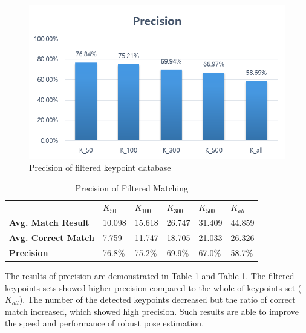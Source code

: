 \begin{figure}[t!]
\centering
\includegraphics[width=1.0\columnwidth]{4_experiments/precision}
\caption{Precision of filtered keypoint database}
\label{fig:markerless_precision}
\end{figure}

\begin{table}[b!]
\centering
\begin{tabular}{llllll}
\hline
\textbf{}                   & \textbf{$K_{50}$} & \textbf{$K_{100}$} & \textbf{$K_{300}$} & \textbf{$K_{500}$} & \textbf{$K_{all}$} \\
\textbf{Avg. Match Result}  & 10.098            & 15.618             & 26.747             & 31.409             & 44.859             \\
\textbf{Avg. Correct Match} & 7.759             & 11.747             & 18.705             & 21.033             & 26.326             \\
\textbf{Precision}          & 76.8\%            & 75.2\%             & 69.9\%             & 67.0\%             & 58.7\%             \\ \hline
\end{tabular}
  \caption{Precision of Filtered Matching}
  \label{tab:markerless_precision}
\end{table}


The results of precision are demonstrated in Table \ref{tab:markerless_precision} and Table \ref{fig:markerless_precision}. The filtered keypoints sets showed higher precision compared to the whole of keypoints set ($K_{all}$). The number of the detected keypoints decreased but the ratio of correct match increased, which showed high precision. Such results are able to improve the speed and performance of robust pose estimation.  
